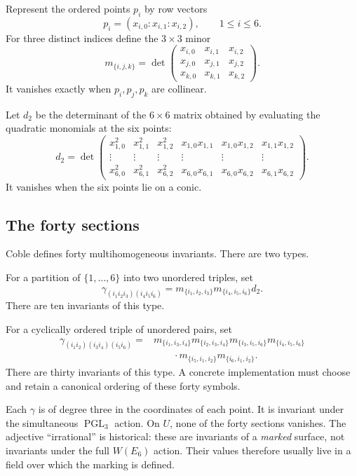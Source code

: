 \documentclass[11pt]{article}
\begin{document}
Represent the ordered points $p_i$ by row vectors
\[
  p_i=(x_{i,0}:x_{i,1}:x_{i,2}),\qquad 1\leq i\leq 6.
\]
For three distinct indices define the $3\times 3$ minor
\[
  m_{\{i,j,k\}}
  =\det\begin{pmatrix}
    x_{i,0}&x_{i,1}&x_{i,2}\\
    x_{j,0}&x_{j,1}&x_{j,2}\\
    x_{k,0}&x_{k,1}&x_{k,2}
  \end{pmatrix}.
\]
It vanishes exactly when $p_i,p_j,p_k$ are collinear.

Let $d_2$ be the determinant of the $6\times6$ matrix obtained by evaluating
the quadratic monomials at the six points:
\[
 d_2=
 \det\begin{pmatrix}
 x_{1,0}^2&x_{1,1}^2&x_{1,2}^2&x_{1,0}x_{1,1}&x_{1,0}x_{1,2}&x_{1,1}x_{1,2}\\
 \vdots&\vdots&\vdots&\vdots&\vdots&\vdots\\
 x_{6,0}^2&x_{6,1}^2&x_{6,2}^2&x_{6,0}x_{6,1}&x_{6,0}x_{6,2}&x_{6,1}x_{6,2}
 \end{pmatrix}.
\]
It vanishes when the six points lie on a conic.

\subsection{The forty sections}

Coble defines forty multihomogeneous invariants.  There are two types.

For a partition of $\{1,\ldots,6\}$ into two unordered triples, set
\[
 \gamma_{(i_1i_2i_3)(i_4i_5i_6)}
 =m_{\{i_1,i_2,i_3\}}m_{\{i_4,i_5,i_6\}}d_2.
\]
There are ten invariants of this type.

For a cyclically ordered triple of unordered pairs, set
\[
\begin{aligned}
 \gamma_{(i_1i_2)(i_3i_4)(i_5i_6)}={}&
 m_{\{i_1,i_3,i_4\}}m_{\{i_2,i_3,i_4\}}
 m_{\{i_3,i_5,i_6\}}m_{\{i_4,i_5,i_6\}}\\
 &\qquad\cdot
 m_{\{i_5,i_1,i_2\}}m_{\{i_6,i_1,i_2\}}.
\end{aligned}
\]
There are thirty invariants of this type.  A concrete implementation must
choose and retain a canonical ordering of these forty symbols.

Each $\gamma$ is of degree three in the coordinates of each point.  It is
invariant under the simultaneous $\operatorname{PGL}_3$ action.  On $U$, none
of the forty sections vanishes.  The adjective ``irrational'' is historical:
these are invariants of a \emph{marked} surface, not invariants under the full
$W(E_6)$ action.  Their values therefore usually live in a field over which
the marking is defined.
\end{document}
